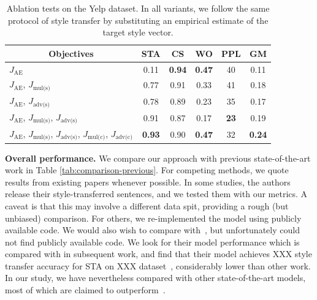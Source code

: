 \documentclass[11pt,a4paper]{article}
\newcommand{\tabc}[2]{\multicolumn{1}{|c||}{\multirow{#1}{*}{\textbf{#2}}}}
\newcommand{\loss}[1]{J_{\text{#1}}}
\begin{document}
\begin{table}[ht]
	\centering\vspace{-.2cm}\small
	\begin{tabular}{| l || c | c | c | c || c |}
		\hline
		\tabc{1}{Objectives}                                                            & \textbf{STA}  & \textbf{CS}   & \textbf{WO}   & \textbf{PPL} & \textbf{GM}   \\
		\hline\hline
		$\loss{AE}$                                                                     & 0.11          & \textbf{0.94} & \textbf{0.47} & 40           & 0.11          \\ \hline
		$\loss{AE}$, $\loss{mul(s)}$                                                    & 0.77          & 0.91          & 0.33          & 41           & 0.18          \\ \hline
		$\loss{AE}$, $\loss{adv(s)}$                                                    & 0.78          & 0.89          & 0.23          & 35           & 0.17          \\ \hline
		$\loss{AE}$, $\loss{mul(s)}$, $\loss{adv(s)}$                                   & 0.91          & 0.87          & 0.17          & \textbf{23}  & 0.19          \\ \hline
		$\loss{AE}$, $\loss{mul(s)}$, $\loss{adv(s)}$, $\loss{mul(c)}$, $\loss{adv(c)}$ & \textbf{0.93} & 0.90          & \textbf{0.47} & 32           & \textbf{0.24} \\ \hline
	\end{tabular}\vspace{-.2cm}
	\caption{Ablation tests on the Yelp dataset. In all variants, we follow the same protocol of style transfer by substituting an empirical estimate of the target style vector.}
	\label{tab:ablation-results}
\end{table}

\textbf{Overall performance.}
We compare our approach with previous state-of-the-art work in Table \ref{tab:comparison-previous}.
For competing methods, we quote results from existing papers whenever possible. In some studies, the authors release their style-transferred sentences, and we tested them with our metrics. A caveat is that this may involve a different data spit, providing a rough (but unbiased) comparison. For others, we re-implemented the model using publicly available code. We would also wish to compare with~, but unfortunately could not find publicly available code. We look for their model performance which is compared with in subsequent work, and find that their model achieves XXX style transfer accuracy for STA on XXX dataset~\cite{}, considerably lower than other work. In our study, we have nevertheless compared with other state-of-the-art models, most of which are claimed to outperform~\cite{}. 
\end{document}
